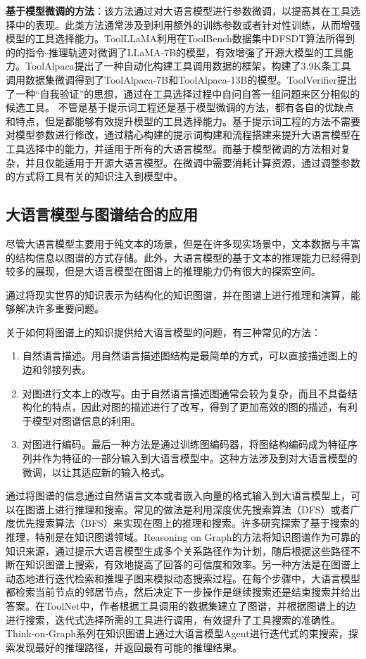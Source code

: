 \textbf{基于模型微调的方法}：该方法通过对大语言模型进行参数微调，以提高其在工具选择中的表现。此类方法通常涉及到利用额外的训练参数或者针对性训练，从而增强模型的工具选择能力。ToolLLaMA\cite{Qin2023}利用在ToolBench数据集中DFSDT算法所得到的的指令-推理轨迹对微调了LLaMA-7B的模型，有效增强了开源大模型的工具能力。ToolAlpaca\cite{Tang2023}提出了一种自动化构建工具调用数据的框架，构建了3.9K条工具调用数据集微调得到了ToolAlpaca-7B和ToolAlpaca-13B的模型。ToolVerifier\cite{Mekala2024}提出了一种“自我验证”的思想，通过在工具选择过程中自问自答一组问题来区分相似的候选工具。
不管是基于提示词工程还是基于模型微调的方法，都有各自的优缺点和特点，但是都能够有效提升模型的工具选择能力。基于提示词工程的方法不需要对模型参数进行修改，通过精心构建的提示词构建和流程搭建来提升大语言模型在工具选择中的能力，并适用于所有的大语言模型。而基于模型微调的方法相对复杂，并且仅能适用于开源大语言模型。在微调中需要消耗计算资源，通过调整参数的方式将工具有关的知识注入到模型中。

\subsection{大语言模型与图谱结合的应用}

尽管大语言模型主要用于纯文本的场景，但是在许多现实场景中，文本数据与丰富的结构信息以图谱的方式存储。此外，大语言模型的基于文本的推理能力已经得到较多的展现，但是大语言模型在图谱上的推理能力仍有很大的探索空间。

通过将现实世界的知识表示为结构化的知识图谱，并在图谱上进行推理和演算，能够解决许多重要问题。

关于如何将图谱上的知识提供给大语言模型的问题，有三种常见的方法：

\begin{enumerate}
    \item 自然语言描述。用自然语言描述图结构是最简单的方式，可以直接描述图上的边和邻接列表。
    \item 对图进行文本上的改写。由于自然语言描述图通常会较为复杂，而且不具备结构化的特点，因此对图的描述进行了改写，得到了更加高效的图的描述，有利于模型对图谱信息的利用。
    \item 对图进行编码。最后一种方法是通过训练图编码器，将图结构编码成为特征序列并作为特征的一部分输入到大语言模型中。这种方法涉及到对大语言模型的微调，以让其适应新的输入格式。
\end{enumerate}

通过将图谱的信息通过自然语言文本或者嵌入向量的格式输入到大语言模型上，可以在图谱上进行推理和搜索。常见的做法是利用深度优先搜索算法（DFS）或者广度优先搜索算法（BFS）来实现在图上的推理和搜索。许多研究探索了基于搜索的推理，特别是在知识图谱领域。Reasoning on Graph\cite{Luo2023}的方法将知识图谱作为可靠的知识来源，通过提示大语言模型生成多个关系路径作为计划，随后根据这些路径不断在知识图谱上搜索，有效地提高了回答的可信度和效率。另一种方法是在图谱上动态地进行迭代检索和推理子图来模拟动态搜索过程\cite{Liu2024, Sun2023, Ma2024}。在每个步骤中，大语言模型都检索当前节点的邻居节点，然后决定下一步操作是继续搜索还是结束搜索并给出答案。在ToolNet\cite{Liu2024}中，作者根据工具调用的数据集建立了图谱，并根据图谱上的边进行搜索，迭代式选择所需的工具进行调用，有效提升了工具搜索的准确性。Think-on-Graph系列\cite{Sun2023,Ma2024}在知识图谱上通过大语言模型Agent进行迭代式的束搜索，探索发现最好的推理路径，并返回最有可能的推理结果。


